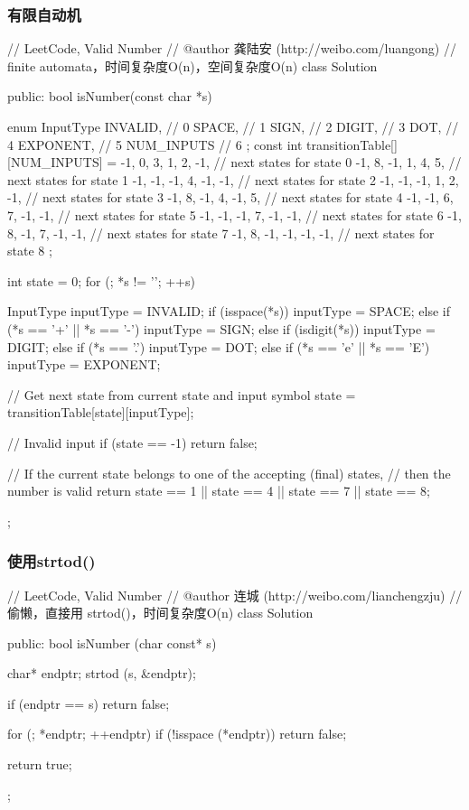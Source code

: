 \subsubsection{有限自动机}
\begin{Code}
// LeetCode, Valid Number
// @author 龚陆安 (http://weibo.com/luangong)
// finite automata，时间复杂度O(n)，空间复杂度O(n)
class Solution {
public:
    bool isNumber(const char *s) {
        enum InputType {
            INVALID,    // 0
            SPACE,      // 1
            SIGN,       // 2
            DIGIT,      // 3
            DOT,        // 4
            EXPONENT,   // 5
            NUM_INPUTS  // 6
        };
        const int transitionTable[][NUM_INPUTS] = {
                -1, 0, 3, 1, 2, -1, // next states for state 0
                -1, 8, -1, 1, 4, 5,     // next states for state 1
                -1, -1, -1, 4, -1, -1,     // next states for state 2
                -1, -1, -1, 1, 2, -1,     // next states for state 3
                -1, 8, -1, 4, -1, 5,     // next states for state 4
                -1, -1, 6, 7, -1, -1,     // next states for state 5
                -1, -1, -1, 7, -1, -1,     // next states for state 6
                -1, 8, -1, 7, -1, -1,     // next states for state 7
                -1, 8, -1, -1, -1, -1,     // next states for state 8
                };

        int state = 0;
        for (; *s != '\0'; ++s) {
            InputType inputType = INVALID;
            if (isspace(*s))
                inputType = SPACE;
            else if (*s == '+' || *s == '-')
                inputType = SIGN;
            else if (isdigit(*s))
                inputType = DIGIT;
            else if (*s == '.')
                inputType = DOT;
            else if (*s == 'e' || *s == 'E')
                inputType = EXPONENT;

            // Get next state from current state and input symbol
            state = transitionTable[state][inputType];

            // Invalid input
            if (state == -1) return false;
        }
        // If the current state belongs to one of the accepting (final) states,
        // then the number is valid
        return state == 1 || state == 4 || state == 7 || state == 8;

    }
};
\end{Code}


\subsubsection{使用strtod()}
\begin{Code}
// LeetCode, Valid Number
// @author 连城 (http://weibo.com/lianchengzju)
// 偷懒，直接用 strtod()，时间复杂度O(n)
class Solution {
public:
    bool isNumber (char const* s) {
        char* endptr;
        strtod (s, &endptr);

        if (endptr == s) return false;

        for (; *endptr; ++endptr)
            if (!isspace (*endptr)) return false;

        return true;
    }
};
\end{Code}


